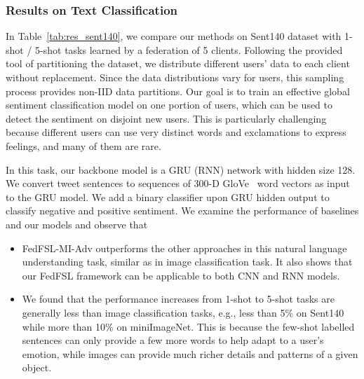\subsubsection{Results on Text Classification}
In Table~\ref{tab:res_sent140}, we compare our methods on Sent140 dataset with 1-shot / 5-shot tasks learned by a federation of 5 clients. 
Following the provided tool of partitioning the dataset, we distribute different users' data to each client without replacement. Since the data distributions vary for users, this sampling process provides non-IID data partitions. Our goal is to train an effective global sentiment classification model on one portion of users, which can be used to detect the sentiment on disjoint new users. This is particularly challenging because different users can use very distinct words and exclamations to express feelings, and many of them are rare.

In this task, our backbone model is a GRU (RNN) network with hidden size 128. We convert tweet sentences to sequences of 300-D GloVe~\cite{pennington2014glove} word vectors as input to the GRU model. We add a binary classifier upon GRU hidden output to classify negative and positive sentiment.
We examine the performance of baselines and our models and observe that
\begin{itemize}[leftmargin=*]
\item FedFSL-MI-Adv outperforms the other approaches in this natural language understanding task, similar as in image classification task. It also shows that our FedFSL framework can be applicable to both CNN and RNN models.
\item We found that the performance increases from 1-shot to 5-shot tasks are generally less than image classification tasks, e.g., less than 5\% on Sent140 while more than 10\% on miniImageNet. This is because the few-shot labelled sentences can only provide a few more words to help adapt to a user's emotion, while images can provide much richer details and patterns of a given object.
\end{itemize}

